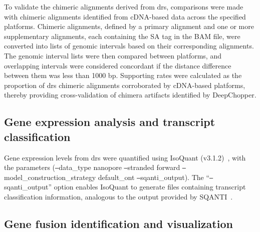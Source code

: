 \documentclass[pdflatex,sn-nature, lineno]{sn-jnl}%
\begin{document}
To validate the chimeric alignments derived from \gls{drs}, comparisons were made with chimeric alignments identified from cDNA-based data across the specified platforms.
Chimeric alignments, defined by a primary alignment and one or more supplementary alignments, each containing the SA tag in the BAM file, were converted into lists of genomic intervals based on their corresponding alignments.
The genomic interval lists were then compared between platforms, and overlapping intervals were considered concordant if the distance difference between them was less than 1000 bp.
Supporting rates were calculated as the proportion of \gls{drs} chimeric alignments corroborated by cDNA-based platforms, thereby providing cross-validation of chimera artifacts identified by DeepChopper.


\subsection{Gene expression analysis and transcript classification}

Gene expression levels from \gls{drs} were quantified using IsoQuant (v3.1.2)~\cite{prjibelski2023accurate}, with the parameters (\texttt{--}data\_type nanopore \texttt{--}stranded forward \texttt{--}model\_construction\_strategy default\_ont \texttt{--}sqanti\_output). The ``\texttt{--}sqanti\_output'' option enables IsoQuant to generate files containing transcript classification information, analogous to the output provided by SQANTI~\cite{tardaguila2018sqanti}.


\subsection{Gene fusion identification and visualization}
\end{document}
